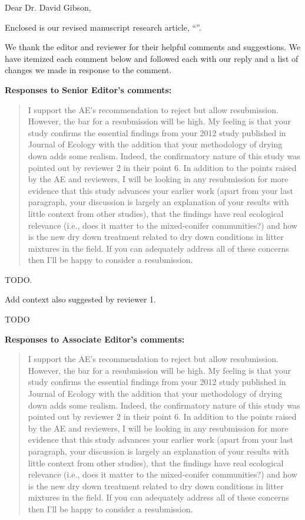 \documentclass[letterpaper, 12pt]{letter}
\begin{document}
\begin{letter}{}

\opening{Dear Dr. David Gibson,}

Enclosed is our revised manuscript research article, ``''.

We thank the editor and reviewer for their helpful comments and suggestions. We
have itemized each comment below and followed each with our reply and a list of
changes we made in response to the comment. 


{\bf Responses to Senior Editor's comments:}

\begin{quote}
 I support the AE's recommendation to reject but allow resubmission. However, the bar for a resubmission will be high. My feeling is that your study confirms the essential findings from your 2012 study published in Journal of Ecology with the addition that your methodology of drying down adds some realism. Indeed, the confirmatory nature of this study was pointed out by reviewer 2 in their point 6. In addition to the points raised by the AE and reviewers, I will be looking in any resubmission for more evidence that this study advances your earlier work (apart from your last paragraph, your discussion is largely an explanation of your results with little context from other studies), that the findings have real ecological relevance (i.e., does it matter to the mixed-conifer communities?) and how is the new dry down treatment related to dry down conditions in litter mixtures in the field. If you can adequately address all of these concerns then I'll be happy to consider a resubmission.
\end{quote}

TODO.

Add context also suggested by reviewer 1.

\begin{quote}
 
\end{quote}

TODO


{\bf Responses to Associate Editor's comments:}

\begin{quote}
I support the AE's recommendation to reject but allow resubmission. However, the bar for a resubmission will be high. My feeling is that your study confirms the essential findings from your 2012 study published in Journal of Ecology with the addition that your methodology of drying down adds some realism. Indeed, the confirmatory nature of this study was pointed out by reviewer 2 in their point 6. In addition to the points raised by the AE and reviewers, I will be looking in any resubmission for more evidence that this study advances your earlier work (apart from your last paragraph, your discussion is largely an explanation of your results with little context from other studies), that the findings have real ecological relevance (i.e., does it matter to the mixed-conifer communities?) and how is the new dry down treatment related to dry down conditions in litter mixtures in the field. If you can adequately address all of these concerns then I'll be happy to consider a resubmission.
\end{quote}


\end{letter}
\end{document}

